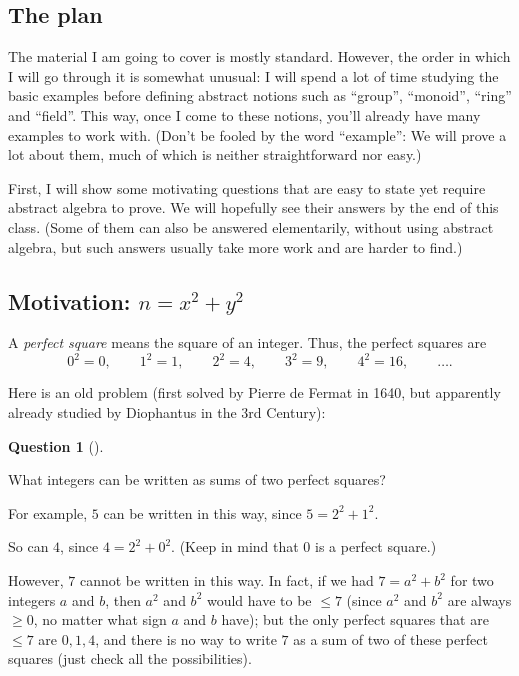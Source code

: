 \documentclass[numbers=enddot,12pt,final,onecolumn,notitlepage]{scrartcl}%
\numberwithin{exer}{section}
\theoremstyle{definition}
\newtheorem{quest}[theo]{Question}
\newenvironment{question}[1][]
{\begin{quest}[#1]\begin{leftbar}}
{\end{leftbar}\end{quest}}
\newenvironment{question}[1][Question]{\noindent\textbf{#1.} }{\ \rule{0.5em}{0.5em}}
\begin{document}
\subsection{The plan}

The material I am going to cover is mostly standard.
However, the order in which I will go through it is somewhat unusual:
I will spend a lot of time studying the basic examples before defining
abstract notions such as ``group'', ``monoid'', ``ring'' and ``field''.
This way, once I come to these notions, you'll already have many
examples to work with.
(Don't be fooled by the word ``example'': We will prove a lot about them,
much of which is neither straightforward nor easy.)

First, I will show some motivating questions that are easy to state yet
require abstract algebra to prove. We will hopefully see their answers
by the end of this class. (Some of them can also be answered elementarily,
without using abstract algebra, but such answers usually take more work
and are harder to find.)

\subsection{\label{subsect.intro.sum-of-2sq}Motivation: $n=x^{2}+y^{2}$}

A \textit{perfect square} means the square of an integer. Thus, the
perfect squares are
\[
 0^2 = 0, \qquad 1^2 = 1, \qquad 2^2 = 4, \qquad 3^2 = 9, \qquad 4^2 = 16,
 \qquad \ldots .
\]

Here is an old problem (first solved by Pierre de Fermat in 1640, but
apparently already studied by Diophantus in the 3rd Century):

\begin{question} \label{quest.intro.sum-of-2sq.1}
What integers can be written as sums of two perfect squares?
\end{question}

For example, $5$ can be written in this way, since $5=2^{2}+1^{2}$.

So can $4$, since $4=2^{2}+0^{2}$. (Keep in mind that $0$ is a perfect square.)

However, $7$ cannot be written in this way. In fact, if we had $7 = a^2 + b^2$
for two integers $a$ and $b$, then $a^2$ and $b^2$ would have to be $\leq 7$
(since $a^2$ and $b^2$ are always $\geq 0$, no matter what sign $a$ and $b$ have);
but the only perfect squares that are $\leq 7$ are $0,1,4$, and there is no
way to write $7$ as a sum of two of these perfect squares (just check all the
possibilities).
\end{document}
